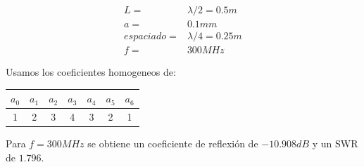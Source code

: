 \documentclass[11pt]{book}
\begin{document}
\begin{align*}
	L = &\lambda/2 =  0.5m \\
	a = & 0.1mm \\
	espaciado = & \lambda / 4 = 0.25m \\
	f = & 300MHz
\end{align*}

Usamos los coeficientes homogeneos de:

\begin{tabular}{c|c|c|c|c|c|c}
	$a_0$ & $a_1$ & $a_2$ & $a_3$ & $a_4$ & $a_5$ & $a_6$ \\ \hline
	1 & 2 & 3 & 4 & 3 & 2 & 1 \\
\end{tabular}

Para $f=300MHz$ se obtiene un coeficiente de reflexión de $-10.908dB$ y un SWR de $1.796$. 
\end{document}
